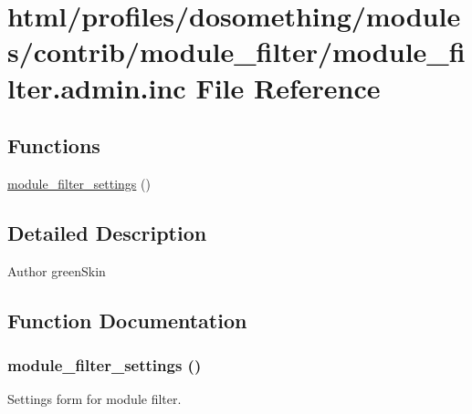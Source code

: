 \hypertarget{module__filter_8admin_8inc}{
\section{html/profiles/dosomething/modules/contrib/module\_\-filter/module\_\-filter.admin.inc File Reference}
\label{module__filter_8admin_8inc}
}
\subsection*{Functions}
\begin{DoxyCompactItemize}
\item 
\hyperlink{module__filter_8admin_8inc_a0df6a73613243ff3487b53bd69dc6f7f}{module\_\-filter\_\-settings} ()
\end{DoxyCompactItemize}


\subsection{Detailed Description}
\begin{DoxyAuthor}{Author}
greenSkin 
\end{DoxyAuthor}


\subsection{Function Documentation}
\hypertarget{module__filter_8admin_8inc_a0df6a73613243ff3487b53bd69dc6f7f}{
\subsubsection[{module\_\-filter\_\-settings}]{\setlength{\rightskip}{0pt plus 5cm}module\_\-filter\_\-settings ()}}
\label{module__filter_8admin_8inc_a0df6a73613243ff3487b53bd69dc6f7f}
Settings form for module filter. 